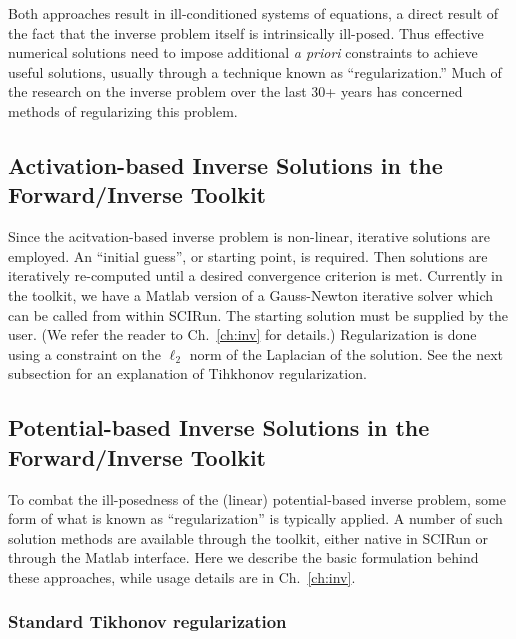 Both approaches result in ill-conditioned systems of equations, a direct
result of the fact that the inverse problem itself is intrinsically
ill-posed. Thus effective numerical solutions need to impose additional
\textit{a priori} constraints to achieve useful solutions, usually through
a technique known as ``regularization.'' Much of the research on the
inverse problem over the last 30+ years has concerned methods of
regularizing this problem.

\subsection{Activation-based Inverse Solutions in the Forward/Inverse Toolkit}

Since the acitvation-based inverse problem is non-linear, iterative solutions
are employed. An ``initial guess'', or starting point, is required. Then
solutions are iteratively re-computed until a desired convergence criterion
is met. Currently in the toolkit, we have a Matlab version of a Gauss-Newton
iterative solver which can be called from within SCIRun. The starting
solution must be supplied by the user. (We refer the reader to
Ch.~\ref{ch:inv} for details.) Regularization is done using a constraint on
the $\ell_{2}$ norm of the Laplacian of the solution. See the next subsection
for an explanation of Tihkhonov regularization.

\subsection{Potential-based Inverse Solutions in the Forward/Inverse Toolkit}

To combat the ill-posedness of the (linear) potential-based inverse
problem, some form of what is known as ``regularization'' is typically
applied. A number of such solution methods are available through the
toolkit, either native in SCIRun or through the Matlab interface. Here we
describe the basic formulation behind these approaches, while usage details
are in Ch.~\ref{ch:inv}.

\subsubsection{Standard Tikhonov regularization}
\label{sec:math_tikhonov}

